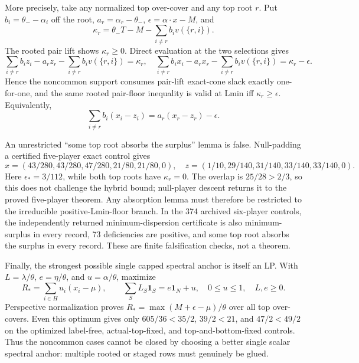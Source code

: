 \documentclass[11pt]{article}
\begin{document}
More precisely, take any normalized top over-cover and any top root $r$.
Put $b_i=\theta_--\alpha_i$ off the root,
$a_r=\alpha_r-\theta_-$, $\epsilon=\alpha\cdot x-M$, and
\[
 \kappa_r=\theta_-T-M-\sum_{i\ne r}b_i v(\{r,i\}).    \tag{NSA}
\]
The rooted pair lift shows $\kappa_r\ge0$.  Direct evaluation at the two
selections gives
\[
 \sum_{i\ne r}b_i z_i-a_rz_r-\sum_{i\ne r}b_i v(\{r,i\})=\kappa_r,
\quad
 \sum_{i\ne r}b_i x_i-a_rx_r-\sum_{i\ne r}b_i v(\{r,i\})
   =\kappa_r-\epsilon.                                \tag{NSAxz}
\]
Hence the noncommon support consumes pair-lift exact-cone slack exactly
one-for-one, and the same rooted pair-floor inequality is valid at Lmin iff
$\kappa_r\ge\epsilon$.  Equivalently,
\[
 \sum_{i\ne r}b_i(x_i-z_i)=a_r(x_r-z_r)-\epsilon.     \tag{NSAD}
\]

An unrestricted ``some top root absorbs the surplus'' lemma is false.
Null-padding a certified five-player exact control gives
\[
 x=(43/280,43/280,47/280,21/80,21/80,0),
\quad z=(1/10,29/140,31/140,33/140,33/140,0).
\]
Here $\epsilon_*=3/112$, while both top roots have $\kappa_r=0$.  The overlap
is $25/28>2/3$, so this does not challenge the hybrid bound; null-player
descent returns it to the proved five-player theorem.  Any absorption lemma
must therefore be restricted to the irreducible positive-Lmin-floor branch.
In the 374 archived six-player controls, the independently returned
minimum-dispersion certificate is also minimum-surplus in every record, 73
deficiencies are positive, and some top root
absorbs the surplus in every record.  These are finite falsification checks,
not a theorem.

Finally, the strongest possible single capped spectral anchor is itself an
LP.  With $L=\lambda/\theta$, $e=\eta/\theta$, and
$u=\alpha/\theta$, maximize
\[
 R_* =\sum_{i\in H}u_i(x_i-\mu),\qquad
 \sum_S L_S\mathbf1_S=e\mathbf1_N+u,\quad 0\le u\le1,
 \quad L,e\ge0.                                      \tag{BSA}
\]
Perspective normalization proves
$R_*=\max(M+\epsilon-\mu)/\theta$ over all top over-covers.  Even this optimum
gives only $605/36<35/2$, $39/2<21$, and $47/2<49/2$ on the optimized
label-free, actual-top-fixed, and top-and-bottom-fixed controls.  Thus the
noncommon cases cannot be closed by choosing a better single scalar spectral
anchor: multiple rooted or staged rows must genuinely be glued.
\end{document}
